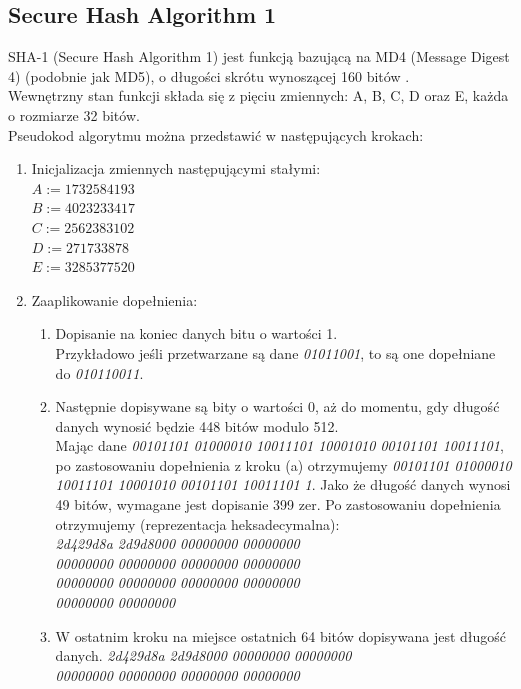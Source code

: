 \subsection{Secure Hash Algorithm 1}
SHA-1 (Secure Hash Algorithm 1) jest funkcją bazującą na MD4 (Message Digest 4) (podobnie jak MD5), o długości skrótu wynoszącej 160 bitów \cite{cryptoirf}. \\
Wewnętrzny stan funkcji składa się z pięciu zmiennych: A, B, C, D oraz E, każda o rozmiarze 32 bitów. \\
Pseudokod algorytmu można przedstawić w następujących krokach:
\begin{enumerate}
	\item Inicjalizacja zmiennych następującymi stałymi: \\
		$A := 1732584193$ \\
		$B := 4023233417$ \\
		$C := 2562383102$ \\
		$D := 271733878$ \\
		$E := 3285377520$ 
	\item Zaaplikowanie dopełnienia:
		\begin{enumerate}
			\item Dopisanie na koniec danych bitu o wartości 1. \\ 
			Przykładowo jeśli przetwarzane są dane \textit{01011001}, to są one dopełniane do \textit{010110011}.
			\item Następnie dopisywane są bity o wartości 0, aż do momentu, gdy długość danych wynosić będzie 448 bitów modulo 512. \\
			Mając dane \textit{00101101 01000010 10011101 10001010 00101101 10011101}, po zastosowaniu dopełnienia z kroku (a) otrzymujemy \textit{00101101 01000010 10011101 10001010 00101101 10011101 1}. Jako że długość danych wynosi 49 bitów, wymagane jest dopisanie 399 zer. Po zastosowaniu dopełnienia otrzymujemy (reprezentacja heksadecymalna): \\
			\textit{2d429d8a 2d9d8000 00000000 00000000 \\ 
					00000000 00000000 00000000 00000000 \\ 
					00000000 00000000 00000000 00000000 \\ 
					00000000 00000000 }
			\item W ostatnim kroku na miejsce ostatnich 64 bitów dopisywana jest długość danych. 
			\textit{2d429d8a 2d9d8000 00000000 00000000 \\ 
					00000000 00000000 00000000 00000000 \\ 
}
\end{enumerate}
\end{enumerate}
